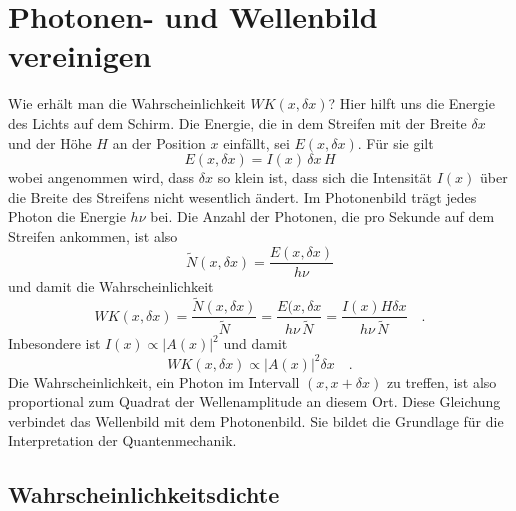 \section{Photonen- und Wellenbild vereinigen}

Wie erhält man die Wahrscheinlichkeit $WK(x, \delta x)$? Hier hilft uns die Energie des Lichts auf dem Schirm. Die Energie, die in dem Streifen mit der Breite $\delta x$ und der Höhe $H$ an der Position $x$ einfällt, sei $E(x, \delta x)$. Für sie gilt 
\begin{equation}
    E(x, \delta x) = I(x) \, \delta x \, H
\end{equation}
wobei angenommen wird, dass $\delta x$ so klein ist, dass sich die Intensität $I(x)$ über die Breite des Streifens nicht wesentlich ändert. Im Photonenbild trägt jedes Photon die Energie $h \nu$ bei. Die Anzahl der Photonen, die pro Sekunde auf dem Streifen ankommen, ist also 
\begin{equation}
    \tilde{N}(x, \delta x) =\frac{ E(x, \delta x)}{h \nu}
\end{equation}
und damit die Wahrscheinlichkeit
\begin{equation}
    WK(x, \delta x) =  \frac{\tilde{N}(x, \delta x) }{\tilde{N}} =
    \frac{ E(x, \delta x}{h \nu \, \tilde{N}} = 
    \frac{ I(x) H \delta x}{h \nu \, \tilde{N}}     \quad .
\end{equation}
Inbesondere ist  $I(x) \propto |A(x)|^2$ und damit
\begin{equation}
    WK(x, \delta x)  \propto |A(x)|^2 \delta x \quad .
\end{equation}
Die Wahrscheinlichkeit, ein Photon im Intervall $(x, x+\delta x)$ zu treffen, ist also proportional zum Quadrat der Wellenamplitude an diesem Ort. Diese Gleichung verbindet das Wellenbild mit dem Photonenbild. Sie bildet die Grundlage für die Interpretation der Quantenmechanik.



\subsection{Wahrscheinlichkeitsdichte}

